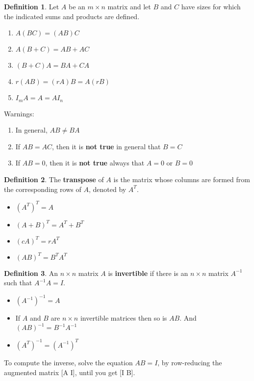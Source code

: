 \documentclass[letterpaper]{article}
\theoremstyle{definition}
\newtheorem{definition}{Definition}[section]
\begin{document}
\begin{definition}
Let $A$ be an $m \times n$ matrix and let $B$ and $C$ have sizes for which the indicated sums and products are defined. 
\begin{enumerate}
	\item $A(BC) = (AB)C$
	\item $A(B + C) = AB + AC$
	\item $(B + C)A = BA + CA $
	\item $r(AB) = (rA)B = A(rB)$
	\item $I_m A = A = AI_n$
\end{enumerate}
Warnings: 
\begin{enumerate}
	\item In general, $AB \neq BA$ 
	\item If $AB = AC$, then it is \textbf{not true} in general that $B=C$
	\item If $AB = 0$, then it is \textbf{not true} always that $A=0$ or $B=0$
\end{enumerate}
\end{definition}

\begin{definition}
The \textbf{transpose} of $A$ is the matrix whose columns are formed from the corresponding rows of $A$, denoted by $A^T$. 
\begin{itemize}
	\item $(A^T)^T = A$
	\item $(A + B)^T = A^T + B^T$
	\item $(cA)^T = rA^T$
	\item $(AB)^T = B^T A^T$
\end{itemize}
\end{definition}

\begin{definition}
An $n \times n$ matrix $A$ is \textbf{invertible} if there is an $n \times n$ matrix $A^{-1}$ such that $A^{-1}A = I$. 
\begin{itemize}
	\item $(A^{-1})^{-1} = A$
	\item If $A$ and $B$ are $n \times n$ invertible matrices then so is $AB$. And $(AB)^{-1} = B^{-1}A^{-1}$
	\item $(A^T)^{-1} = (A^{-1})^T$
\end{itemize}
To compute the inverse, solve the equation  $AB = I$, by row-reducing the augmented matrix [A  I], until you get [I  B]. 
\end{definition}
\end{document}
